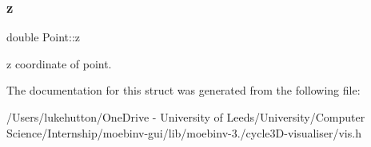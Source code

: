 \subsubsection{\texorpdfstring{z}{z}}
{\footnotesize\ttfamily double Point\+::z}

z coordinate of point. 

The documentation for this struct was generated from the following file\+:\begin{DoxyCompactItemize}
\item 
/\+Users/lukehutton/\+One\+Drive -\/ University of Leeds/\+University/\+Computer Science/\+Internship/moebinv-\/gui/lib/moebinv-\/3./cycle3\+D-\/visualiser/vis.\+h\end{DoxyCompactItemize}
